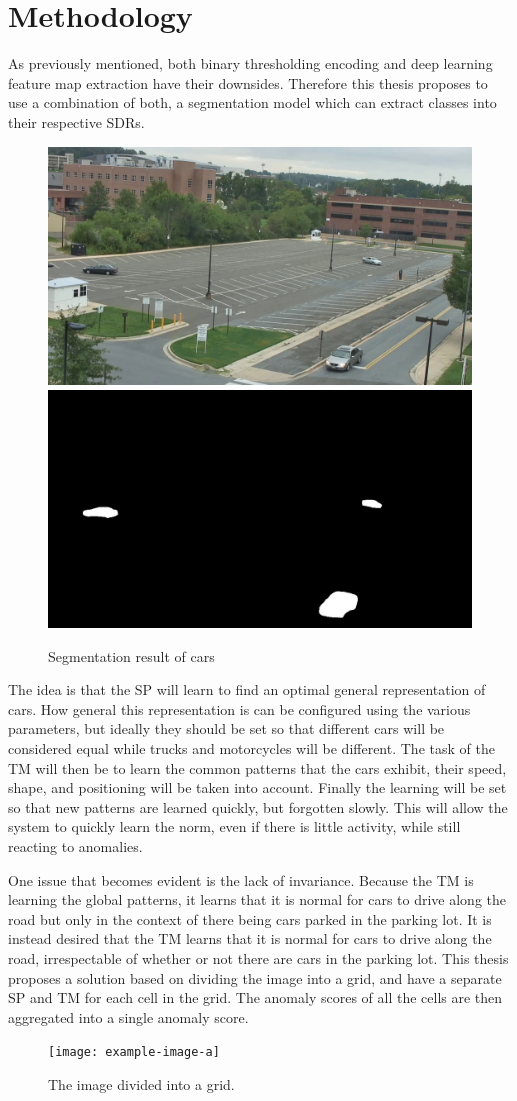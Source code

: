 \chapter{Methodology}
As previously mentioned, both binary thresholding encoding and deep learning feature map extraction have their downsides. Therefore this thesis proposes to use a combination of both, a segmentation model which can extract classes into their respective SDRs.
\begin{figure}[H]
\centering
\includegraphics[width=.45\textwidth]{resources/methodology/original.png}\hfill
\includegraphics[width=.45\textwidth]{resources/methodology/car_segmentation.png}
\caption{Segmentation result of cars}
\label{fig:figure3}
\end{figure}
The idea is that the SP will learn to find an optimal general representation of cars. How general this representation is can be configured using the various parameters, but ideally they should be set so that different cars will be considered equal while trucks and motorcycles will be different. The task of the TM will then be to learn the common patterns that the cars exhibit, their speed, shape, and positioning will be taken into account. Finally the learning will be set so that new patterns are learned quickly, but forgotten slowly. This will allow the system to quickly learn the norm, even if there is little activity, while still reacting to anomalies.\par
One issue that becomes evident is the lack of invariance. Because the TM is learning the global patterns, it learns that it is normal for cars to drive along the road but only in the context of there being cars parked in the parking lot. It is instead desired that the TM learns that it is normal for cars to drive along the road, irrespectable of whether or not there are cars in the parking lot. This thesis proposes a solution based on dividing the image into a grid, and have a separate SP and TM for each cell in the grid. The anomaly scores of all the cells are then aggregated into a single anomaly score.
\begin{figure}[H]
\centering
\texttt{[image: example-image-a]}
\caption{The image divided into a grid.}
\label{fig:grid}
\end{figure}

